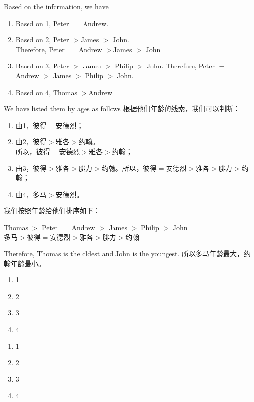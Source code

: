\begin{solution}
\begin{paracol}{2}
Based on the information, we have
\begin{enumerate}
\item Based on 1, Peter $=$ Andrew.
\item Based on 2, Peter $>$James $>$ John. \\
Therefore, Peter  $=$ Andrew $>$James $>$ John
\item Based on 3, Peter $>$ James $>$ Philip $>$ John. Therefore, 
Peter $=$ Andrew  $>$ James $>$ Philip $>$ John.
\item Based on 4, Thomas $>$Andrew.
\end{enumerate}
We have listed them by ages as follows
\switchcolumn[1]
根据他们年龄的线索，我们可以判断：
\begin{enumerate}
\item 由1，彼得$=$安德烈；
\item 由2，彼得$>$雅各$>$约翰。\\所以，彼得$=$安德烈$>$雅各$>$约翰；
\item 由3，彼得$>$雅各$>$腓力$>$约翰。所以，彼得$=$安德烈$>$雅各$>$腓力$>$约翰；
\item 由4，多马$>$安德烈。
\end{enumerate}
我们按照年龄给他们排序如下：
\end{paracol}
\begin{center}
Thomas $>$ Peter $=$ Andrew  $>$ James $>$ Philip $>$ John\\
多马$>$彼得$=$安德烈$>$雅各$>$腓力$>$约翰
\end{center}
\begin{paracol}{2}
Therefore, Thomas is the oldest and John is the youngest.
\switchcolumn[1]
所以多马年龄最大，约翰年龄最小。
\end{paracol}
\end{solution}

\begin{exercise}
\begin{paracol}{2}
\begin{enumerate}
\item 1
\item 2
\item 3
\item 4
\end{enumerate}
\switchcolumn[1]
\begin{enumerate}
\item 1
\item 2
\item 3
\item 4
\end{enumerate}
\end{paracol}
\end{exercise}
   \newpage